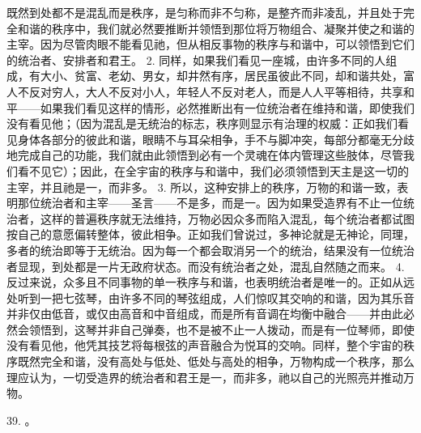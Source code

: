 既然到处都不是混乱而是秩序，是匀称而非不匀称，是整齐而非凌乱，并且处于完全和谐的秩序中，我们就必然要推断并领悟到那位将万物组合、凝聚并使之和谐的主宰。因为尽管肉眼不能看见祂，但从相反事物的秩序与和谐中，可以领悟到它们的统治者、安排者和君王。 2. 同样，如果我们看见一座城，由许多不同的人组成，有大小、贫富、老幼、男女，却井然有序，居民虽彼此不同，却和谐共处，富人不反对穷人，大人不反对小人，年轻人不反对老人，而是人人平等相待，共享和平——如果我们看见这样的情形，必然推断出有一位统治者在维持和谐，即使我们没有看见他；（因为混乱是无统治的标志，秩序则显示有治理的权威：正如我们看见身体各部分的彼此和谐，眼睛不与耳朵相争，手不与脚冲突，每部分都毫无分歧地完成自己的功能，我们就由此领悟到必有一个灵魂在体内管理这些肢体，尽管我们看不见它）；因此，在全宇宙的秩序与和谐中，我们必须领悟到天主是这一切的主宰，并且祂是一，而非多。 3. 所以，这种安排上的秩序，万物的和谐一致，表明那位统治者和主宰——圣言——不是多，而是一。因为如果受造界有不止一位统治者，这样的普遍秩序就无法维持，万物必因众多而陷入混乱，每个统治者都试图按自己的意愿偏转整体，彼此相争。正如我们曾说过，多神论就是无神论，同理，多者的统治即等于无统治。因为每一个都会取消另一个的统治，结果没有一位统治者显现，到处都是一片无政府状态。而没有统治者之处，混乱自然随之而来。 4. 反过来说，众多且不同事物的单一秩序与和谐，也表明统治者是唯一的。正如从远处听到一把七弦琴，由许多不同的琴弦组成，人们惊叹其交响的和谐，因为其乐音并非仅由低音，或仅由高音和中音组成，而是所有音调在均衡中融合——并由此必然会领悟到，这琴并非自己弹奏，也不是被不止一人拨动，而是有一位琴师，即使没有看见他，他凭其技艺将每根弦的声音融合为悦耳的交响。同样，整个宇宙的秩序既然完全和谐，没有高处与低处、低处与高处的相争，万物构成一个秩序，那么理应认为，一切受造界的统治者和君王是一，而非多，祂以自己的光照亮并推动万物。\par

39. 。\par

